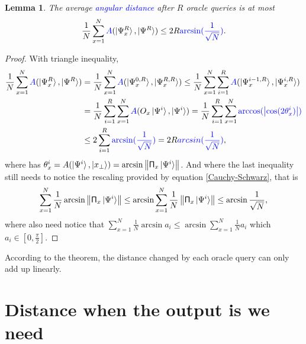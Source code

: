 \documentclass[a4paper,10pt]{book}
\newtheorem{lemma}{Lemma}[section]
\numberwithin{equation}{section}
\begin{document}
\begin{lemma}
    The average \textcolor{blue}{angular distance} after $R$ oracle queries is at most
    \begin{equation}
        \frac{1}{N}\sum_{x=1}^{N}\textcolor{blue}{A}(\ket{\Psi_{x}^{R}},\ket{\Psi^{R}})\leq 2R\textcolor{blue}{\arcsin(\frac{1}{\sqrt{N}})}.
    \end{equation}
\end{lemma}
\begin{proof}
    With triangle inequality,
    \begin{equation*}
        \begin{split}
            \frac{1}{N}\sum_{x=1}^{N}\textcolor{blue}{A}(\ket{\Psi_{x}^{R}},\ket{\Psi^{R}})
             & = \frac{1}{N}\sum_{x=1}^{N}\textcolor{blue}{A}(\ket{\Psi_{x}^{0,R}},\ket{\Psi_{x}^{R,R}})
            \leq \frac{1}{N}\sum_{x=1}^{N}\sum_{i=1}^{R}\textcolor{blue}{A}(\ket{\Psi_{x}^{i-1,R}},\ket{\Psi_{x}^{i,R}})           \\
             & = \frac{1}{N}\sum_{i=1}^{R}\sum_{x=1}^{N}\textcolor{blue}{A}(O_{x}\ket{\Psi^{i}},\ket{\Psi^{i}})
            = \frac{1}{N}\sum_{i=1}^{R}\sum_{x=1}^{N}\textcolor{blue}{\arccos(\left\lvert\cos(2\theta_{x}^{i})\right\rvert)}       \\
             & \leq 2\sum_{i=1}^{R}\textcolor{blue}{\arcsin(\frac{1}{\sqrt{N}})} = 2R\textcolor{blue}{arcsin(\frac{1}{\sqrt{N}})},
        \end{split}
    \end{equation*}
    where has $\theta_{x}^{i}=A(\ket{\Psi^{i}},\ket{x_{\perp}})=\arcsin\left\| \mathsf{\Pi}_{x}\ket{\Psi^{i}}\right\|$. And where the last inequality still needs to notice the rescaling provided by equation \ref{Cauchy-Schwarz}, that is
    \begin{equation*}
        \sum_{x=1}^{N}\frac{1}{N}\arcsin\left\|\mathsf{\Pi}_{x}\ket{\Psi^{i}}\right\|\leq\arcsin\sum_{x=1}^{N}\frac{1}{N}\left\|\mathsf{\Pi}_{x}\ket{\Psi^{i}}\right\|\leq\arcsin\frac{1}{\sqrt{N}},
    \end{equation*}
    where also need notice that $\sum_{x=1}^{N}\frac{1}{N}\arcsin a_{i}\leq\arcsin\sum_{x=1}^{N}\frac{1}{N}a_{i}$ which $a_{i}\in\left[0,\frac{\pi}{2}\right]$.
\end{proof}
According to the theorem, the distance changed by each oracle query can only add up linearly.



\section{\label{DistanceWhenWeNeed}Distance when the output is we need}
\end{document}
